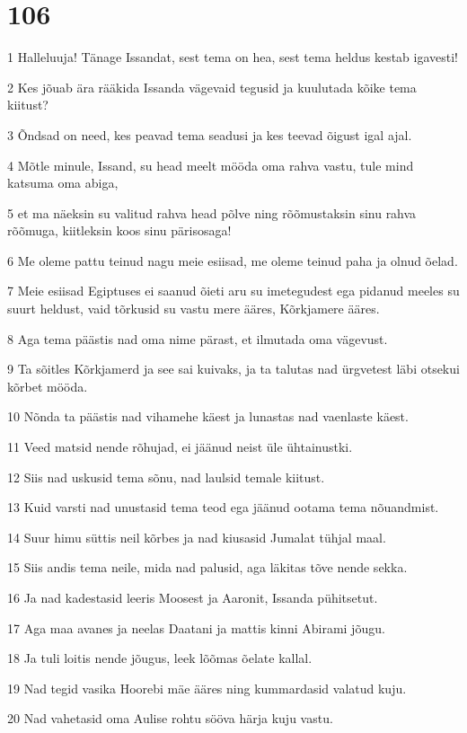 \chapter{106}

\par 1 Halleluuja! Tänage Issandat, sest tema on hea, sest tema heldus kestab igavesti!
\par 2 Kes jõuab ära rääkida Issanda vägevaid tegusid ja kuulutada kõike tema kiitust?
\par 3 Õndsad on need, kes peavad tema seadusi ja kes teevad õigust igal ajal.
\par 4 Mõtle minule, Issand, su head meelt mööda oma rahva vastu, tule mind katsuma oma abiga,
\par 5 et ma näeksin su valitud rahva head põlve ning rõõmustaksin sinu rahva rõõmuga, kiitleksin koos sinu pärisosaga!
\par 6 Me oleme pattu teinud nagu meie esiisad, me oleme teinud paha ja olnud õelad.
\par 7 Meie esiisad Egiptuses ei saanud õieti aru su imetegudest ega pidanud meeles su suurt heldust, vaid tõrkusid su vastu mere ääres, Kõrkjamere ääres.
\par 8 Aga tema päästis nad oma nime pärast, et ilmutada oma vägevust.
\par 9 Ta sõitles Kõrkjamerd ja see sai kuivaks, ja ta talutas nad ürgvetest läbi otsekui kõrbet mööda.
\par 10 Nõnda ta päästis nad vihamehe käest ja lunastas nad vaenlaste käest.
\par 11 Veed matsid nende rõhujad, ei jäänud neist üle ühtainustki.
\par 12 Siis nad uskusid tema sõnu, nad laulsid temale kiitust.
\par 13 Kuid varsti nad unustasid tema teod ega jäänud ootama tema nõuandmist.
\par 14 Suur himu süttis neil kõrbes ja nad kiusasid Jumalat tühjal maal.
\par 15 Siis andis tema neile, mida nad palusid, aga läkitas tõve nende sekka.
\par 16 Ja nad kadestasid leeris Moosest ja Aaronit, Issanda pühitsetut.
\par 17 Aga maa avanes ja neelas Daatani ja mattis kinni Abirami jõugu.
\par 18 Ja tuli loitis nende jõugus, leek lõõmas õelate kallal.
\par 19 Nad tegid vasika Hoorebi mäe ääres ning kummardasid valatud kuju.
\par 20 Nad vahetasid oma Aulise rohtu sööva härja kuju vastu.
